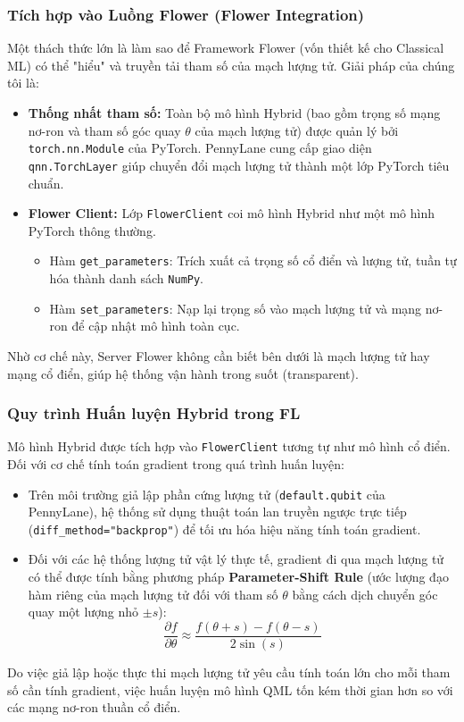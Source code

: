 \subsubsection{Tích hợp vào Luồng Flower (Flower Integration)}
Một thách thức lớn là làm sao để Framework Flower (vốn thiết kế cho Classical ML) có thể "hiểu" và truyền tải tham số của mạch lượng tử. Giải pháp của chúng tôi là:

\begin{itemize}
    \item \textbf{Thống nhất tham số:} Toàn bộ mô hình Hybrid (bao gồm trọng số mạng nơ-ron và tham số góc quay $\theta$ của mạch lượng tử) được quản lý bởi \texttt{torch.nn.Module} của PyTorch. PennyLane cung cấp giao diện \texttt{qnn.TorchLayer} giúp chuyển đổi mạch lượng tử thành một lớp PyTorch tiêu chuẩn.
    \item \textbf{Flower Client:} Lớp \texttt{FlowerClient} coi mô hình Hybrid như một mô hình PyTorch thông thường.
    \begin{itemize}
        \item Hàm \texttt{get\_parameters}: Trích xuất cả trọng số cổ điển và lượng tử, tuần tự hóa thành danh sách \texttt{NumPy}.
        \item Hàm \texttt{set\_parameters}: Nạp lại trọng số vào mạch lượng tử và mạng nơ-ron để cập nhật mô hình toàn cục.
    \end{itemize}
\end{itemize}
Nhờ cơ chế này, Server Flower không cần biết bên dưới là mạch lượng tử hay mạng cổ điển, giúp hệ thống vận hành trong suốt (transparent).


\subsubsection{Quy trình Huấn luyện Hybrid trong FL}
Mô hình Hybrid được tích hợp vào \texttt{FlowerClient} tương tự như mô hình cổ điển. Đối với cơ chế tính toán gradient trong quá trình huấn luyện:
\begin{itemize}
    \item Trên môi trường giả lập phần cứng lượng tử (\texttt{default.qubit} của PennyLane), hệ thống sử dụng thuật toán lan truyền ngược trực tiếp (\texttt{diff\_method="backprop"}) để tối ưu hóa hiệu năng tính toán gradient.
    \item Đối với các hệ thống lượng tử vật lý thực tế, gradient đi qua mạch lượng tử có thể được tính bằng phương pháp \textbf{Parameter-Shift Rule} (ước lượng đạo hàm riêng của mạch lượng tử đối với tham số $\theta$ bằng cách dịch chuyển góc quay một lượng nhỏ $\pm s$):
    $$\frac{\partial f}{\partial \theta} \approx \frac{f(\theta + s) - f(\theta - s)}{2 \sin(s)}$$
\end{itemize}
Do việc giả lập hoặc thực thi mạch lượng tử yêu cầu tính toán lớn cho mỗi tham số cần tính gradient, việc huấn luyện mô hình QML tốn kém thời gian hơn so với các mạng nơ-ron thuần cổ điển.

